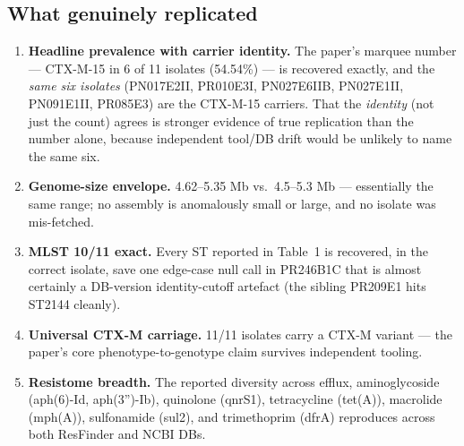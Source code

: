 \documentclass[11pt]{article}
\begin{document}
\subsection*{What genuinely replicated}
\begin{enumerate}[leftmargin=1.4em]
  \item \textbf{Headline prevalence with carrier identity.} The paper's
        marquee number --- CTX-M-15 in 6 of 11 isolates (54.54\%) --- is
        recovered exactly, and the \emph{same six isolates}
        (PN017E2II, PR010E3I, PN027E6IIB, PN027E1II, PN091E1II, PR085E3) are
        the CTX-M-15 carriers. That the \emph{identity} (not just the count)
        agrees is stronger evidence of true replication than the number
        alone, because independent tool/DB drift would be unlikely to name
        the same six.
  \item \textbf{Genome-size envelope.} 4.62--5.35 Mb vs.\ 4.5--5.3 Mb ---
        essentially the same range; no assembly is anomalously small or
        large, and no isolate was mis-fetched.
  \item \textbf{MLST 10/11 exact.} Every ST reported in Table~1 is
        recovered, in the correct isolate, save one edge-case null call in
        PR246B1C that is almost certainly a DB-version identity-cutoff
        artefact (the sibling PR209E1 hits ST2144 cleanly).
  \item \textbf{Universal CTX-M carriage.} 11/11 isolates carry a CTX-M
        variant --- the paper's core phenotype-to-genotype claim survives
        independent tooling.
  \item \textbf{Resistome breadth.} The reported diversity across efflux,
        aminoglycoside (aph(6)-Id, aph(3'')-Ib), quinolone (qnrS1),
        tetracycline (tet(A)), macrolide (mph(A)), sulfonamide (sul2), and
        trimethoprim (dfrA) reproduces across both ResFinder and NCBI DBs.
\end{enumerate}
\end{document}
